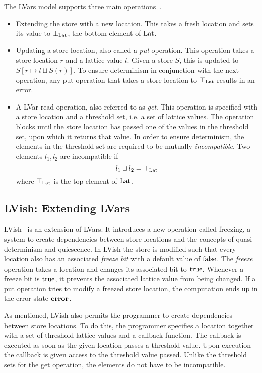 The LVars model supports three main operations~\parencite{kuper2013lvars}.
\begin{itemize}
  \item Extending the store with a new location. This takes a fresh location and
    sets its value to $\bot_{\mathrm{Lat}}$, the bottom element of $\mathrm{Lat}$.
  \item Updating a store location, also called a \emph{put} operation. This
    operation takes a store location $r$ and a lattice value $l$. Given a store
    $S$, this is updated to $S[r \mapsto l\sqcup S(r)]$. To ensure determinism in
    conjunction with the next operation, any put operation that takes a store
    location to $\top_{\mathrm{Lat}}$ results in an error.
  \item A LVar read operation, also referred to as \emph{get}. This operation is
    specified with a store location and a threshold set, i.e. a set of lattice
    values. The operation blocks until the store location has passed one of the
    values in the threshold set, upon which it returns that value. In order to
    ensure determinism, the elements in the threshold set are required to be
    mutually \emph{incompatible}. Two elements $l_1, l_2$ are incompatible if
    \begin{equation*}
      l_1 \sqcup l_2 = \top_{\mathrm{Lat}}
    \end{equation*}
    where $\top_{\mathrm{Lat}}$ is the top element of $\mathrm{Lat}$.
\end{itemize}

\subsection{LVish: Extending LVars}%
\label{sub:lvish_extending_lvars}

LVish~\parencite{kuper2014freeze} is an extension of LVars. It introduces a new
operation called freezing, a system to create dependencies between store
locations and the concepts of quasi-determinism and quiescence.  In LVish the
store is modified such that every location also has an associated \emph{freeze
bit} with a default value of $\mathrm{false}$. The \emph{freeze} operation
takes a location and changes its associated bit to $\mathrm{true}$.  Whenever a
freeze bit is $\mathrm{true}$, it prevents the associated lattice value from being
changed. If a put operation tries to modify a freezed store location, the
computation ends up in the error state $\mbox{{\bf error}}$.

As mentioned, LVish also permits the programmer to create dependencies between
store locations. To do this, the programmer specifies a location together with a
set of threshold lattice values and a callback function. The callback is
executed as soon as the given location passes a threshold value. Upon execution
the callback is given access to the threshold value passed. Unlike the threshold
sets for the get operation, the elements do not have to be incompatible. 

